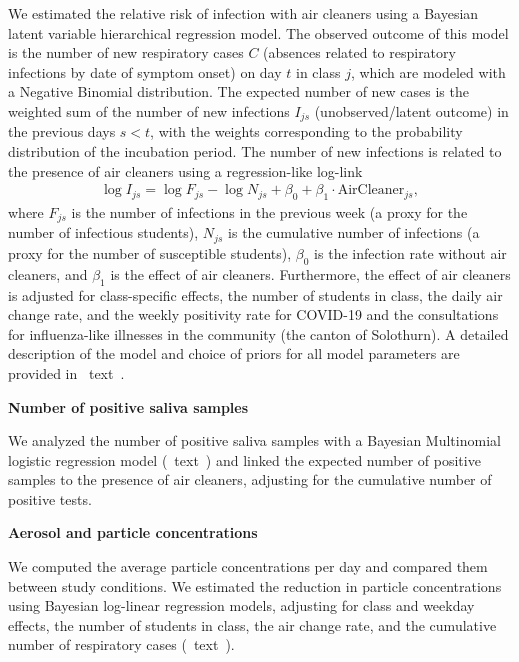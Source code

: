 \documentclass[fleqn,11pt]{wlscirep}
\begin{document}
\noindent We estimated the relative risk of infection with air cleaners using a Bayesian latent variable hierarchical regression model. The observed outcome of this model is the number of new respiratory cases $C$ (absences related to respiratory infections by date of symptom onset) on day $t$ in class $j$, which are modeled with a Negative Binomial distribution. The expected number of new cases is the weighted sum of the number of new infections $I_{js}$ (unobserved/latent outcome) in the previous days $s<t$, with the weights corresponding to the probability distribution of the incubation period. The number of new infections is related to the presence of air cleaners using a regression-like log-link
\begin{align}
    \log I_{js} = \log F_{js} - \log N_{js} + \beta_0 + \beta_1 \cdot \text{AirCleaner}_{js},
\end{align}
where $F_{js}$ is the number of infections in the previous week (a proxy for the number of infectious students), $N_{js}$ is the cumulative number of infections (a proxy for the number of susceptible students), $\beta_0$ is the infection rate without air cleaners, and $\beta_1$ is the effect of air cleaners. Furthermore, the effect of air cleaners is adjusted for class-specific effects, the number of students in class, the daily air change rate, and the weekly positivity rate for COVID-19 and the consultations for influenza-like illnesses in the community (\ie the canton of Solothurn). A detailed description of the model and choice of priors for all model parameters are provided in \supp~text~. \medskip

\noindent\textbf{Number of positive saliva samples} \smallskip

\noindent We analyzed the number of positive saliva samples with a Bayesian Multinomial logistic regression model (\supp~text~) and linked the expected number of positive samples to the presence of air cleaners, adjusting for the cumulative number of positive tests. \medskip

\noindent\textbf{Aerosol and particle concentrations} \smallskip

\noindent We computed the average particle concentrations per day and compared them between study conditions. We estimated the reduction in particle concentrations using Bayesian log-linear regression models, adjusting for class and weekday effects, the number of students in class, the air change rate, and the cumulative number of respiratory cases (\supp~text~). \medskip
\end{document}
